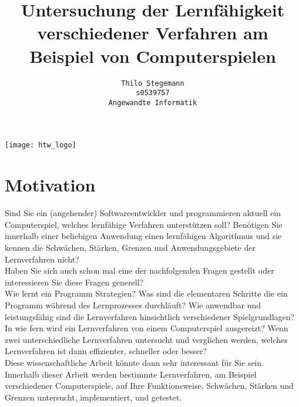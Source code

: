 \documentclass[12pt,a4paper]{scrartcl}
\begin{document}
\subject{Exposé Bachelorarbeit}
\author{
	\texttt{Thilo Stegemann}\\
	\texttt{s0539757}\\
	\texttt{Angewandte Informatik}}
\title{Untersuchung der Lernfähigkeit verschiedener Verfahren am Beispiel von Computerspielen}

\maketitle
\centerline{\texttt{[image: htw\_logo]}}

\section*{Motivation}
Sind Sie ein (angehender) Softwareentwickler und programmieren aktuell ein Computerspiel, welches lernfähige Verfahren unterstützen soll? Benötigen Sie innerhalb einer beliebigen Anwendung einen lernfähigen Algorithmus und sie kennen die Schwächen, Stärken, Grenzen und Anwendungsgebiete der Lernverfahren nicht?\\

Haben Sie sich auch schon mal eine der nachfolgenden Fragen gestellt oder interessieren Sie diese Fragen generell?\\

Wie lernt ein Programm Strategien? Was sind die elementaren Schritte die ein Programm  während des Lernprozesses durchläuft? Wie anwendbar und leistungsfähig sind die Lernverfahren hinsichtlich verschiedener Spielgrundlagen? In wie fern wird ein Lernverfahren von einem Computerspiel ausgereizt? Wenn zwei unterschiedliche Lernverfahren untersucht und verglichen werden, welches Lernverfahren ist dann effizienter, schneller oder besser?\\

Diese wissenschaftliche Arbeit könnte dann sehr interessant für Sie sein. Innerhalb dieser Arbeit werden bestimmte Lernverfahren, am Beispiel verschiedener Computerspiele, auf Ihre Funktionsweise, Schwächen, Stärken und Grenzen untersucht, implementiert, und getestet. 
\end{document}
